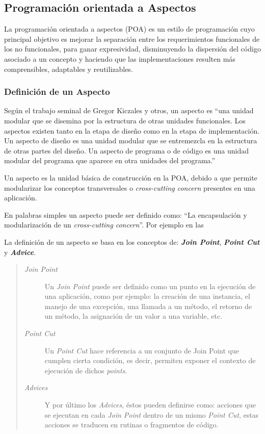 \subsection{Programación orientada a Aspectos}

	La programación orientada a aspectos (POA) es un estilo de programación cuyo
	principal objetivo es mejorar la  separación entre los requerimientos
	funcionales de los no funcionales, para ganar expresividad, disminuyendo la
	dispersión del código asociado a un concepto y haciendo que las
	implementaciones resulten más comprensibles, adaptables y reutilizables.


\subsubsection{Definición de un Aspecto}
	Según el trabajo seminal de Gregor Kiczales y otros, un aspecto es 
	``una unidad modular que se disemina por la estructura de
	otras unidades funcionales. Los aspectos existen tanto en la etapa de
	diseño como en la etapa de implementación. Un aspecto de diseño es
	una unidad modular que se entremezcla en la estructura de otras partes
	del diseño. Un aspecto de programa o de código es una unidad modular
	del programa que aparece en otra unidades del programa.'' \cite{Kicz97a}

	\bigskip
	
	Un aspecto es la unidad básica de construcción en la POA, debido a que permite
	modularizar los conceptos transversales o \emph{cross-cutting concern} presentes en una aplicación.
	
	En palabras simples un aspecto puede ser definido como: ``La encapsulación y
	modularización de un \emph{cross-cutting concern}''. Por ejemplo en las  
	
	La definición de un aspecto se basa en los conceptos de: {\bf \emph{Join
	Point}}, {\bf \emph{ Point Cut}} y {\bf \emph{ Advice}}.
	
	\begin{quote}
	
	\begin{description}
		\item[\emph{Join Point}] Un \emph{Join Point} puede ser definido como un punto
		en la ejecución de una aplicación, como por ejemplo: la creación de una instancia, el manejo de una
		excepción, una llamada a un método, el retorno de un método, la asignación de
		un valor a una variable, etc.
		
		\item[\emph{Point Cut}] Un \emph{Point Cut} hace referencia a un conjunto de
		Join Point que cumplen cierta condición, es decir, permiten exponer el contexto de
		ejecución de dichos \emph{points}.
		
		\item[\emph{Advices}] Y por último los \emph{Advices}, éstos pueden definirse
		como: acciones que se ejecutan en cada \emph{Join Point} dentro de un mismo
		\emph{Point Cut}, estas acciones se traducen en rutinas o fragmentos de
		código.
	
	\end{description}
	\end{quote}
	
	
